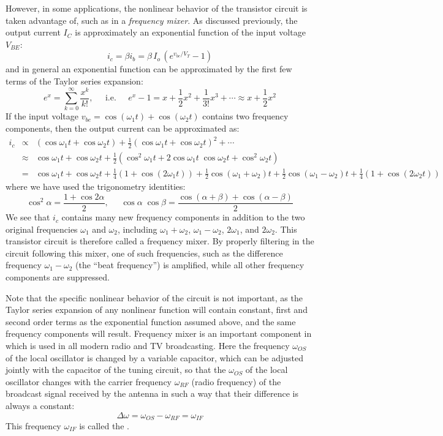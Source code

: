 \begin{itemize}
\begin{itemize}
However, in some applications, the nonlinear behavior of the transistor 
circuit is taken advantage of, such as in a {\em frequency mixer}. As 
discussed previously, the output current $I_C$ is approximately an 
exponential function of the input voltage $V_{BE}$:
\[
i_c=\beta i_b=\beta\, I_o\, (e^{v_{be}/V_T}-1) 
\]
and in general an exponential function can be approximated by the first
few terms of the Taylor series expansion:
\[
e^x=\sum_{k=0}^\infty \frac{x^k}{k!},\;\;\;\;\;\mbox{i.e.}\;\;\;\;\;
e^x-1=x+\frac{1}{2} x^2+\frac{1}{3!} x^3+\cdots
 \approx x+\frac{1}{2} x^2 
\]
If the input voltage $v_{be}=\cos(\omega_1t)+\cos(\omega_2t)$ contains 
two frequency components, then the output current can be approximated as:
\begin{eqnarray} 
  i_c &\propto& (\cos\omega_1t+\cos\omega_2t) +\frac{1}{2}(\cos\omega_1t+\cos\omega_2t)^2 
  +\cdots 
  \nonumber \\
  &\approx &\cos\omega_1t+\cos\omega_2t+\frac{1}{2}\left(\cos^2\omega_1t+2\cos\omega_1t\;\cos\omega_2t +\cos^2\omega_2t\right) 
  \nonumber \\
  &=&\cos\omega_1t+\cos\omega_2t
  +\frac{1}{4}(1+\cos(2\omega_1t))
  +\frac{1}{2}\cos(\omega_1+\omega_2)t  +\frac{1}{2}\cos(\omega_1-\omega_2)t
  +\frac{1}{4}(1+\cos(2\omega_2t))
  \nonumber
\end{eqnarray}
where we have used the trigonometry identities:
\[ 
\cos^2\alpha=\frac{1+\cos 2\alpha}{2},\;\;\;\;\;
\cos\alpha\;\cos\beta=\frac{\cos(\alpha+\beta)+\cos(\alpha-\beta)}{2} 
\]
We see that $i_c$ contains many new frequency components in addition 
to the two original frequencies $\omega_1$ and $\omega_2$, including 
$\omega_1+\omega_2$, $\omega_1-\omega_2$, $2\omega_1$, and $2\omega_2$. 
This transistor circuit is therefore called a frequency mixer. By properly 
filtering in the circuit following this mixer, one of such frequencies, 
such as the difference frequency $\omega_1-\omega_2$ (the ``beat frequency'') 
is amplified, while all other frequency components are suppressed. 

Note that the specific nonlinear behavior of the circuit is not important, 
as the Taylor series expansion of any nonlinear function will contain constant,
first and second order terms as the exponential function assumed above, and 
the same frequency components will result. Frequency mixer is an important 
component in 
which is used in all modern radio and TV broadcasting. Here the frequency 
$\omega_{OS}$ of the local oscillator is changed by a variable capacitor,
which can be adjusted jointly with the capacitor of the tuning circuit, so 
that the $\omega_{OS}$ of the local oscillator changes with the carrier 
frequency $\omega_{RF}$ (radio frequency) of the broadcast signal received
by the antenna in such a way that their difference is always a constant:
\[
\Delta\omega=\omega_{OS}-\omega_{RF}=\omega_{IF}
\]
This frequency $\omega_{IF}$ is called the 
. 


\end{itemize}
\end{itemize}
